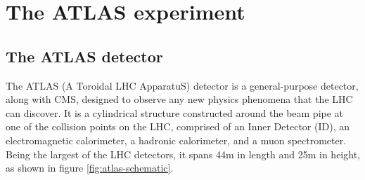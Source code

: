 \chapter{The ATLAS experiment}
\label{chap:ATLAS-detector}




\section{The ATLAS detector}
The ATLAS (A Toroidal LHC ApparatuS) detector is a general-purpose detector, along with CMS, designed to observe any new physics phenomena that the LHC can discover. It is a cylindrical structure constructed around the beam pipe at one of the collision points on the LHC, comprised of an Inner Detector (ID), an electromagnetic calorimeter, a hadronic calorimeter, and a muon spectrometer. Being the largest of the LHC detectors, it spans 44m in length and 25m in height, as shown in figure \ref{fig:atlas-schematic}.

